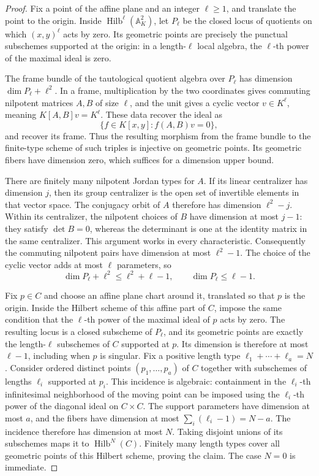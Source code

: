 \begin{proof}
Fix a point of the affine plane and an integer $\ell\geq1$, and
translate the point to the origin.  Inside
$\operatorname{Hilb}^{\ell}(\mathbb A^2_K)$, let $P_\ell$ be the closed
locus of quotients on which $(x,y)^\ell$ acts by zero.
Its geometric points are precisely the punctual subschemes supported at
the origin: in a length-$\ell$ local algebra, the $\ell$-th power of
the maximal ideal is zero.

The frame bundle of the tautological quotient algebra over $P_\ell$
has dimension $\dim P_\ell+\ell^2$.  In a frame, multiplication by
the two coordinates gives commuting nilpotent matrices $A,B$ of size
$\ell$, and the unit gives a cyclic vector $v\in K^\ell$, meaning
$K[A,B]v=K^\ell$.  These data recover the ideal as
\[
 \{f\in K[x,y]:f(A,B)v=0\},
\]
and recover its frame.  Thus the resulting morphism from the frame
bundle to the finite-type scheme of such triples is injective on geometric points.
Its geometric fibers have dimension zero, which suffices for a
dimension upper bound.

There are finitely many nilpotent Jordan types for $A$.  If its linear
centralizer has dimension $j$, then its group centralizer is the open
set of invertible elements in that vector space.  The conjugacy orbit
of $A$ therefore has dimension $\ell^2-j$.  Within its centralizer,
the nilpotent choices of $B$ have dimension at most $j-1$: they satisfy
$\det B=0$, whereas the determinant is one at the identity matrix in
the same centralizer.  This argument works in every characteristic.
Consequently the commuting nilpotent pairs have dimension at most
$\ell^2-1$.  The choice of the cyclic vector adds at most $\ell$
parameters, so
\[
 \dim P_\ell+\ell^2\leq\ell^2+\ell-1,
 \qquad \dim P_\ell\leq\ell-1.
\]

Fix $p\in C$ and choose an affine plane chart around it, translated so
that $p$ is the origin.  Inside the Hilbert scheme of this affine part
of $C$, impose the same condition that the $\ell$-th power of the
maximal ideal of $p$ acts by zero.  The resulting locus is a closed
subscheme of $P_\ell$, and its geometric points are exactly the
length-$\ell$ subschemes of $C$ supported at $p$.  Its dimension is
therefore at most $\ell-1$, including when $p$ is singular.
Fix a positive length type
$\ell_1+\cdots+\ell_a=N$.  Consider ordered distinct points
$(p_1,\ldots,p_a)$ of $C$ together with subschemes of lengths $\ell_i$
supported at $p_i$.  This incidence is algebraic: containment in the
$\ell_i$-th infinitesimal neighborhood of the moving point can be
imposed using the $\ell_i$-th power of the diagonal ideal on $C\times C$.
The support parameters have dimension at most $a$, and the fibers have
dimension at most $\sum_i(\ell_i-1)=N-a$.  The incidence therefore
has dimension at most $N$.  Taking disjoint unions of its subschemes
maps it to $\operatorname{Hilb}^N(C)$.  Finitely many length types
cover all geometric points of this Hilbert scheme, proving the claim.
The case $N=0$ is immediate.
\end{proof}

